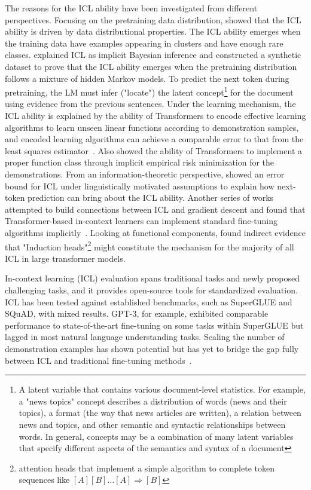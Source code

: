 The reasons for the ICL ability have been investigated from different perspectives.
Focusing on the pretraining data distribution, \textcite{chan2022data} showed that the ICL ability is driven by data distributional properties.
The ICL ability emerges when the training data have examples appearing in clusters and have enough rare classes.
\textcite{xie2022an} explained ICL as implicit Bayesian inference and constructed a synthetic dataset to prove that the ICL ability emerges when the pretraining distribution follows a mixture of hidden Markov models.
To predict the next token during pretraining, the LM must infer ("locate") the latent concept\footnote{A latent variable that contains various document-level statistics. For example, a "news topics" concept describes a distribution of words (news and their topics), a format (the way that news articles are written), a relation between news and topics, and other semantic and syntactic relationships between words. In general, concepts may be a combination of many latent variables that specify different aspects of the semantics and syntax of a document} for the document using evidence from the previous sentences.
Under the learning mechanism, the ICL ability is explained by the ability of Transformers to encode effective learning algorithms to learn unseen linear functions according to demonstration samples, and encoded learning algorithms can achieve a comparable error to that from the least squares estimator~\cite{garg2023transformers}.
Also \textcite{li2023transformers} showed the ability of Transformers to implement a proper function class through implicit empirical risk minimization for the demonstrations.
From an information-theoretic perspective, \textcite{hahn2023theory} showed an error bound for ICL under linguistically motivated assumptions to explain how next-token prediction can bring about the ICL ability.
Another series of works attempted to build connections between ICL and gradient descent and found that Transformer-based in-context learners can implement standard fine-tuning algorithms implicitly~\cite{akyurek2022what, vonoswald2023transformers, li2023transformers}.
Looking at functional components, \textcite{olsson2022incontext} found indirect evidence that "Induction heads"\footnote{attention heads that implement a simple algorithm to complete token sequences like $[A][B] \dots [A] \Rightarrow [B]$} might constitute the mechanism for the majority of all ICL in large transformer models.

In-context learning (ICL) evaluation spans traditional tasks and newly proposed challenging tasks, and it provides open-source tools for standardized evaluation.
ICL has been tested against established benchmarks, such as SuperGLUE and SQuAD, with mixed results.
GPT-3, for example, exhibited comparable performance to state-of-the-art fine-tuning on some tasks within SuperGLUE but lagged in most natural language understanding tasks.
Scaling the number of demonstration examples has shown potential but has yet to bridge the gap fully between ICL and traditional fine-tuning methods~\cite{brown2020language, hao2022structured}.

